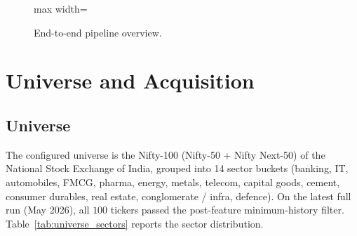 \begin{figure}[H]
\begin{adjustbox}{max width=\textwidth}
\end{adjustbox}
\caption{End-to-end pipeline overview.}
\label{fig:pipeline_overview}
\end{figure}

\section{Universe and Acquisition}

\subsection{Universe}

The configured universe is the Nifty-100 (Nifty-50 + Nifty Next-50) of the National Stock Exchange of India, grouped into 14 sector buckets (banking, IT, automobiles, FMCG, pharma, energy, metals, telecom, capital goods, cement, consumer durables, real estate, conglomerate / infra, defence). On the latest full run (May 2026), all $100$ tickers passed the post-feature minimum-history filter. Table~\ref{tab:universe_sectors} reports the sector distribution.

